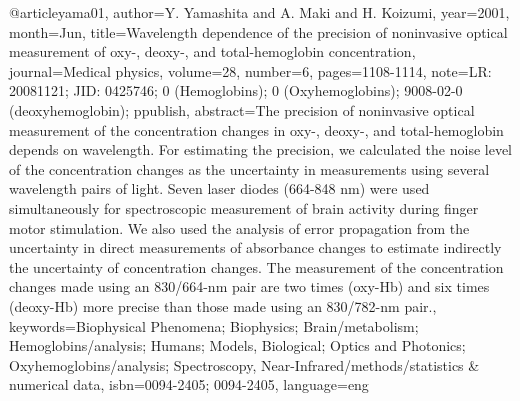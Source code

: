 @article{yama01,
	author={Y. Yamashita and A. Maki and H. Koizumi},
	year={2001},
	month={Jun},
	title={Wavelength dependence of the precision of noninvasive optical measurement of oxy-, deoxy-, and total-hemoglobin concentration},
	journal={Medical physics},
	volume={28},
	number={6},
	pages={1108-1114},
	note={LR: 20081121; JID: 0425746; 0 (Hemoglobins); 0 (Oxyhemoglobins); 9008-02-0 (deoxyhemoglobin); ppublish},
	abstract={The precision of noninvasive optical measurement of the concentration changes in oxy-, deoxy-, and total-hemoglobin depends on wavelength. For estimating the precision, we calculated the noise level of the concentration changes as the uncertainty in measurements using several wavelength pairs of light. Seven laser diodes (664-848 nm) were used simultaneously for spectroscopic measurement of brain activity during finger motor stimulation. We also used the analysis of error propagation from the uncertainty in direct measurements of absorbance changes to estimate indirectly the uncertainty of concentration changes. The measurement of the concentration changes made using an 830/664-nm pair are two times (oxy-Hb) and six times (deoxy-Hb) more precise than those made using an 830/782-nm pair.},
	keywords={Biophysical Phenomena; Biophysics; Brain/metabolism; Hemoglobins/analysis; Humans; Models, Biological; Optics and Photonics; Oxyhemoglobins/analysis; Spectroscopy, Near-Infrared/methods/statistics & numerical data},
	isbn={0094-2405; 0094-2405},
	language={eng}
}


